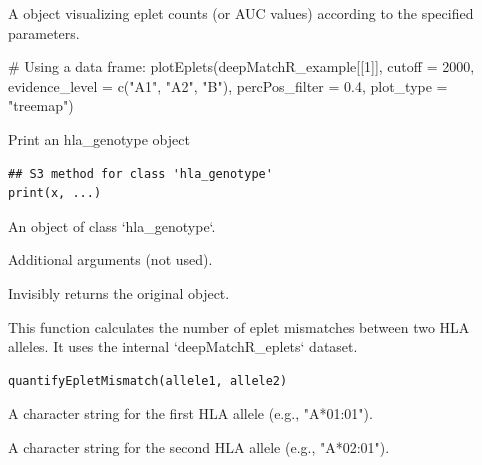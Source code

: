 \documentclass[letterpaper]{book}
\begin{document}
%
\begin{Value}
A  object visualizing eplet counts (or AUC values) according to the
specified parameters.
\end{Value}
%
\begin{Examples}
\begin{ExampleCode}
# Using a data frame:
plotEplets(deepMatchR_example[[1]],
           cutoff = 2000,
           evidence_level = c("A1", "A2", "B"),
           percPos_filter = 0.4,
           plot_type = "treemap")
\end{ExampleCode}
\end{Examples}
%
\begin{Description}
Print an hla\_genotype object
\end{Description}
%
\begin{Usage}
\begin{verbatim}
## S3 method for class 'hla_genotype'
print(x, ...)
\end{verbatim}
\end{Usage}
%
\begin{Arguments}
\begin{ldescription}
\item[\code{x}] An object of class `hla\_genotype`.

\item[\code{...}] Additional arguments (not used).
\end{ldescription}
\end{Arguments}
%
\begin{Value}
Invisibly returns the original object.
\end{Value}
%
\begin{Description}
This function calculates the number of eplet mismatches between two HLA
alleles. It uses the internal `deepMatchR\_eplets` dataset.
\end{Description}
%
\begin{Usage}
\begin{verbatim}
quantifyEpletMismatch(allele1, allele2)
\end{verbatim}
\end{Usage}
%
\begin{Arguments}
\begin{ldescription}
\item[\code{allele1}] A character string for the first HLA allele (e.g., "A*01:01").

\item[\code{allele2}] A character string for the second HLA allele (e.g., "A*02:01").
\end{ldescription}
\end{Arguments}
\end{document}
